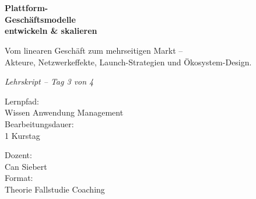 \documentclass[11pt,a4paper,oneside]{article}
\newcommand{\caveatfontfallback}{\itshape}
\newcommand\caveatfont{\caveatfontfallback}%
\begin{document}
\begin{titlepage}
  \pagestyle{empty}
  \vspace*{1.5cm}
  \\[2pt]
  \noindent{\color{lpAccent}\rule{\linewidth}{1.2pt}}\\[4pt]

  \vspace{3cm}
  {\sffamily\fontsize{30}{34}\selectfont\bfseries\color{lpInk}Plattform-\\Geschäftsmodelle\\entwickeln \& skalieren\par}

  \vspace{0.7cm}
  {\sffamily\large\color{lpGray}Vom linearen Geschäft zum mehrseitigen Markt --\\Akteure, Netzwerkeffekte, Launch-Strategien und Ökosystem-Design.\par}

  \vspace{1.5cm}
  {\caveatfont\LARGE\color{lpAmber}Lehrskript -- Tag 3 von 4}\par

  \vfill

  \noindent\begin{minipage}{0.55\linewidth}
    {\sffamily\footnotesize\color{lpGray}Lernpfad:}\\
    {\sffamily\small\color{lpInk}Wissen \textrightarrow{} Anwendung \textrightarrow{} Management}\\[10pt]
    {\sffamily\footnotesize\color{lpGray}Bearbeitungsdauer:}\\
    {\sffamily\small\color{lpInk}1 Kurstag}
  \end{minipage}\hfill
  \begin{minipage}{0.4\linewidth}
    \raggedleft
    {\sffamily\footnotesize\color{lpGray}Dozent:}\\
    {\sffamily\small\color{lpInk}Can Siebert}\\[10pt]
    {\sffamily\footnotesize\color{lpGray}Format:}\\
    {\sffamily\small\color{lpInk}Theorie \textperiodcentered{} Fallstudie \textperiodcentered{} Coaching}
  \end{minipage}

  \vspace{0.5cm}
  \noindent{\color{lpAccent}\rule{\linewidth}{0.6pt}}
\end{titlepage}
\end{document}
